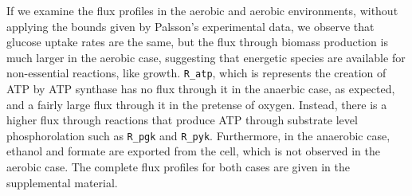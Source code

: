 \documentclass{article}
\begin{document}
If we examine the flux profiles in the aerobic and aerobic environments, without applying the bounds given by Palsson's experimental data, we observe that glucose uptake rates are the same, but the flux through biomass production is much larger in the aerobic case, suggesting that energetic species are available for non-essential reactions, like growth. \texttt{R\_atp}, which is represents the creation of ATP by ATP synthase has no flux through it in the anaerbic case, as expected, and a fairly large flux through it in the pretense of oxygen. Instead, there is a higher flux through reactions that produce ATP through substrate level phosphorolation such as \texttt{R\_pgk} and \texttt{R\_pyk}. Furthermore, in the anaerobic case, ethanol and formate are exported from the cell, which is not observed in the aerobic case. The complete flux profiles for both cases are given in the supplemental material.      
\newpage
 

\newpage
\end{document}
